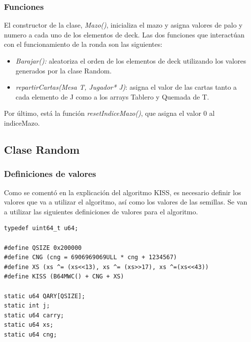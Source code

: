 \subsubsection{Funciones}
El constructor de la clase,\textit{ Mazo()}, inicializa el mazo y asigna valores de palo y numero a cada uno de los elementos de deck.
Las dos funciones que interactúan con el funcionamiento de la ronda son las siguientes:
\begin{itemize}
\item \textit{Barajar():} aleatoriza el orden de los elementos de deck utilizando los valores generados por la clase Random.
\item \textit{repartirCartas(Mesa T, Jugador* J)}: asigna el valor de las cartas tanto a cada elemento de J como a los arrays Tablero y Quemada de T.
\end{itemize}

Por último, está la función  \textit{resetIndiceMazo()}, que asigna el valor 0 al indiceMazo.


\subsection{Clase Random}
\subsubsection{Definiciones de valores}

Como se comentó en la explicación del algoritmo KISS, es necesario definir los valores que va a utilizar el algoritmo, así como los valores de las semillas. Se van a utilizar las siguientes definiciones de valores para el algoritmo.   \cite{kiss2, kiss1}
\begin{verbatim}
typedef uint64_t u64;

#define QSIZE 0x200000
#define CNG (cng = 6906969069ULL * cng + 1234567)
#define XS (xs ^= (xs<<13), xs ^= (xs>>17), xs ^=(xs<<43))
#define KISS (B64MWC() + CNG + XS)

static u64 QARY[QSIZE];
static int j;
static u64 carry;
static u64 xs;
static u64 cng;
\end{verbatim}

